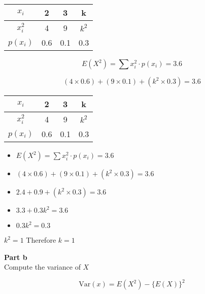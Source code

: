 \documentclass[a4paper,12pt]{article}
\begin{document}
\begin{center}
\begin{tabular}{|c|c|c|c|}
\hline
$x_i$ & \phantom{sp}2\phantom{sp} & \phantom{sp}3\phantom{sp} & \phantom{sp}k\phantom{sp} \\ \hline
$x^2_i$ & 4 & 9 & $k^2$ \\ \hline
$p(x_i)$ & 0.6 &  0.1 & 0.3 \\ \hline 
\end{tabular}
\end{center}


\[ E(X^2) =  \sum  x^2_i \cdot p(x_i)  = 3.6 \]

\[(4 \times 0.6) + (9\times 0.1) + (k^2\times 0.3) = 3.6 \]







\begin{center}
\begin{tabular}{|c|c|c|c|}
\hline
$x_i$ & \phantom{sp}2\phantom{sp} & \phantom{sp}3\phantom{sp} & \phantom{sp}k\phantom{sp} \\ \hline
$x^2_i$ & 4 & 9 & $k^2$ \\ \hline
$p(x_i)$ & 0.6 &  0.1 & 0.3 \\ \hline 
\end{tabular}
\end{center}


\begin{itemize}
\item $ E(X^2) =  \sum  x^2_i \cdot p(x_i)  = 3.6 $
\item $(4 \times 0.6) + (9\times 0.1) + (k^2\times 0.3) = 3.6 $
\item $2.4 + 0.9 + (k^2\times 0.3) = 3.6 $

\item $ 3.3 + 0.3k^2 = 3.6$

\item $0.3k^2 =0.3$
\end{itemize}


\begin{center}
$k^2 = 1$  \qquad Therefore $k=1$
\end{center}




\noindent \textbf{Part b}\\
Compute the variance of $X$

\[ \mbox{Var}(x) = E(X^2) - \{E(X)\}^2 \]
\end{document}
